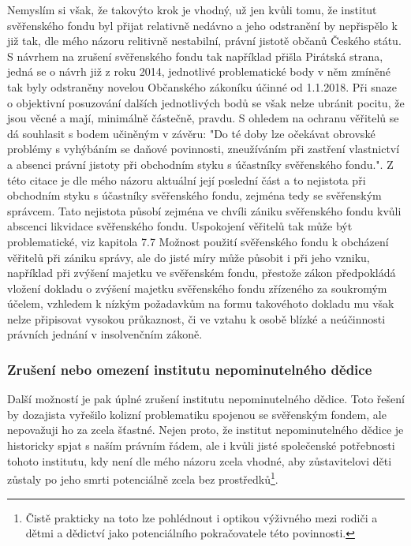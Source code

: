 \documentclass{article}
\begin{document}
Nemyslím si však, že takovýto krok je vhodný, už jen kvůli tomu, že institut svěřenského fondu byl přijat relativně nedávno a jeho odstranění by nepřispělo k již tak, dle mého názoru relitivně nestabilní, právní jistotě občanů Českého státu.\\

S návrhem na zrušení svěřenského fondu tak například přišla Pirátská strana, jedná se o návrh již z roku 2014, jednotlivé problematické body v něm zmíněné tak byly odstraněny novelou Občanského zákoníku účinné od 1.1.2018. Při snaze o objektivní posuzování dalších jednotlivých bodů se však nelze ubránit pocitu, že jsou věcné a mají, minimálně částečně, pravdu. S ohledem na ochranu věřitelů se dá souhlasit s bodem učiněným v závěru: "Do té doby lze očekávat obrovské problémy s vyhýbáním se daňové povinnosti, zneužíváním při zastření vlastnictví a absenci právní jistoty při obchodním styku s účastníky svěřenského fondu.". Z této citace je dle mého názoru aktuální její poslední část a to nejistota při obchodním styku s účastníky svěřenského fondu, zejména tedy se svěřenským správcem. Tato nejistota působí zejména ve chvíli zániku svěřenského fondu kvůli abscenci likvidace svěřenského fondu. Uspokojení věřitelů tak může být problematické, viz kapitola 7.7 Možnost použití svěřenského fondu k obcházení věřitelů při zániku správy, ale do jisté míry může působit i při jeho vzniku, například při zvýšení majetku ve svěřenském fondu, přestože zákon předpokládá vložení dokladu o zvýšení majetku svěřenského fondu zřízeného za soukromým účelem, vzhledem k nízkým požadavkům na formu takovéhoto dokladu mu však nelze připisovat vysokou průkaznost, či ve vztahu k osobě blízké a neúčinnosti právních jednání v insolvenčním zákoně.\\ 


\subsubsection{Zrušení nebo omezení institutu nepominutelného dědice}

Další možností je pak úplné zrušení institutu nepominutelného dědice. Toto řešení by dozajista vyřešilo kolizní problematiku spojenou se svěřenským fondem, ale nepovažuji ho za zcela šťastné. Nejen proto, že institut nepominutelného dědice je historicky spjat s naším právním řádem, ale i kvůli jisté společenské potřebnosti tohoto institutu, kdy není dle mého názoru zcela vhodné, aby zůstavitelovi děti zůstaly po jeho smrti potenciálně zcela bez prostředků\footnote{Čistě prakticky na toto lze pohlédnout i optikou výživného mezi rodiči a dětmi a dědictví jako potenciálního pokračovatele této povinnosti.}.\\
\end{document}

